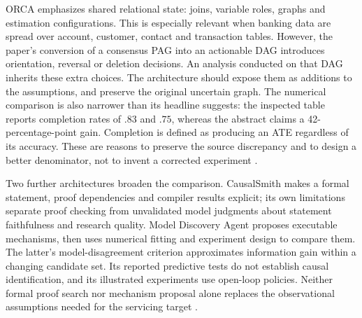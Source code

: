 ORCA emphasizes shared relational state: joins, variable roles, graphs and
estimation configurations. This is especially relevant when banking data are
spread over account, customer, contact and transaction tables. However, the
paper's conversion of a consensus PAG into an actionable DAG introduces
orientation, reversal or deletion decisions. An analysis conducted on that DAG
inherits these extra choices. The architecture should expose them as additions
to the assumptions, and preserve the original uncertain graph. The numerical
comparison is also narrower than its headline suggests: the inspected table
reports completion rates of $.83$ and $.75$, whereas the abstract claims a
42-percentage-point gain. Completion is defined as producing an ATE regardless
of its accuracy. These are reasons to preserve the source discrepancy and to
design a better denominator, not to invent a corrected experiment
\citep{exec13_census_orca}.

Two further architectures broaden the comparison. CausalSmith makes a formal
statement, proof dependencies and compiler results explicit; its own limitations
separate proof checking from unvalidated model judgments about statement
faithfulness and research quality. Model Discovery Agent proposes executable
mechanisms, then uses numerical fitting and experiment design to compare them.
The latter's model-disagreement criterion approximates information gain within
a changing candidate set. Its reported predictive tests do not establish
causal identification, and its illustrated experiments use open-loop policies.
Neither formal proof search nor mechanism proposal alone replaces the
observational assumptions needed for the servicing target
\citep{exec13_census_causalsmith,v12_la_2608_09696}.


